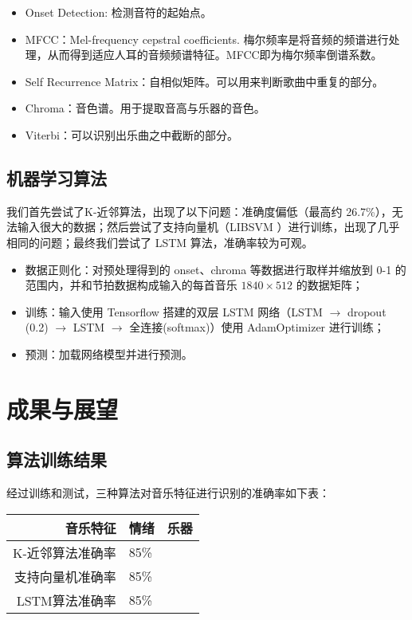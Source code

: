 \documentclass[a4paper,utf8,10pt]{article}
\newcommand{\sept}{\setlength\itemsep{-4pt}}
\begin{document}
\noindent\begin{itemize}
  \sept
  \item Onset Detection: 检测音符的起始点。
  \item MFCC：Mel-frequency cepstral coefficients. 梅尔频率是将音频的频谱进行处理，从而得到适应人耳的音频频谱特征。MFCC即为梅尔频率倒谱系数。
  \item Self Recurrence Matrix：自相似矩阵。可以用来判断歌曲中重复的部分。
  \item Chroma：音色谱。用于提取音高与乐器的音色。
  \item Viterbi：可以识别出乐曲之中截断的部分。
\end{itemize}

\subsection{机器学习算法}

我们首先尝试了K-近邻算法，出现了以下问题：准确度偏低（最高约 26.7\%），无法输入很大的数据；然后尝试了支持向量机（LIBSVM \cite{CC01a}）进行训练，出现了几乎相同的问题；最终我们尝试了 LSTM 算法，准确率较为可观。

\noindent\begin{itemize}
  \sept
  \item 数据正则化：对预处理得到的 onset、chroma 等数据进行取样并缩放到 0-1 的范围内，并和节拍数据构成输入的每首音乐 $1840\times 512$ 的数据矩阵；
  \item 训练：输入使用 Tensorflow 搭建的双层 LSTM 网络（LSTM $\rightarrow$ dropout (0.2) $\rightarrow$ LSTM $\rightarrow$ 全连接(softmax)）使用 AdamOptimizer 进行训练；
  \item 预测：加载网络模型并进行预测。
\end{itemize}

\section{成果与展望}
\subsection{算法训练结果}
经过训练和测试，三种算法对音乐特征进行识别的准确率如下表：

\begin{center}
\begin{tabular}{ r | l | l }
\hline
音乐特征         & 情绪 & 乐器 \\ \hline
K-近邻算法准确率 & 85\% &      \\ \hline
支持向量机准确率 & 85\% &      \\ \hline
LSTM算法准确率   & 85\% &      \\ \hline
\end{tabular}
\end{center}
\end{document}
